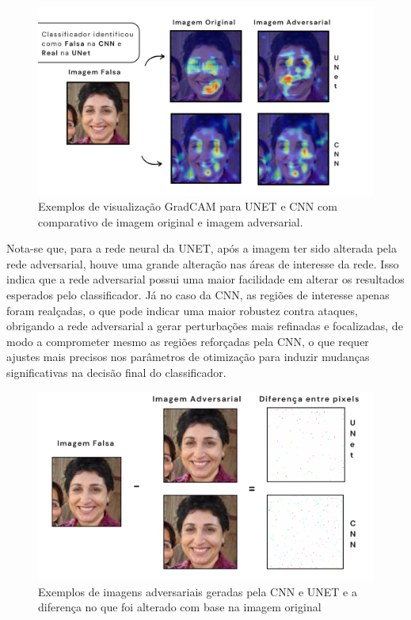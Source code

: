 \documentclass[12pt]{article}
\begin{document}
\begin{figure}[htbp]
    \centering
    \includegraphics[width=1\textwidth]{figs/gradcam-imagem-falsa.png}
    \caption{Exemplos de visualização GradCAM para UNET e CNN com comparativo de imagem original e imagem adversarial.}\label{fig:gradcam_imagem_falsa}
\end{figure}

Nota-se que, para a rede neural da UNET, após a imagem ter sido alterada pela
rede adversarial, houve uma grande alteração nas áreas de interesse da rede.
Isso indica que a rede adversarial possui uma maior facilidade em alterar os
resultados esperados pelo classificador. Já no caso da CNN, as regiões de
interesse apenas foram realçadas, o que pode indicar uma maior robustez contra
ataques, obrigando a rede adversarial a gerar perturbações mais refinadas e
focalizadas, de modo a comprometer mesmo as regiões reforçadas pela CNN, o que
requer ajustes mais precisos nos parâmetros de otimização para induzir mudanças
significativas na decisão final do classificador.

\begin{figure}[htb]
    \centering
    \includegraphics[width=1\textwidth]{figs/pixels-diff-imagem-falsa.png}
    \caption{Exemplos de imagens adversariais geradas pela CNN e UNET e a diferença no que foi alterado com base na imagem original }\label{fig:pixels_diff_imagem_falsa}
\end{figure}
\end{document}
